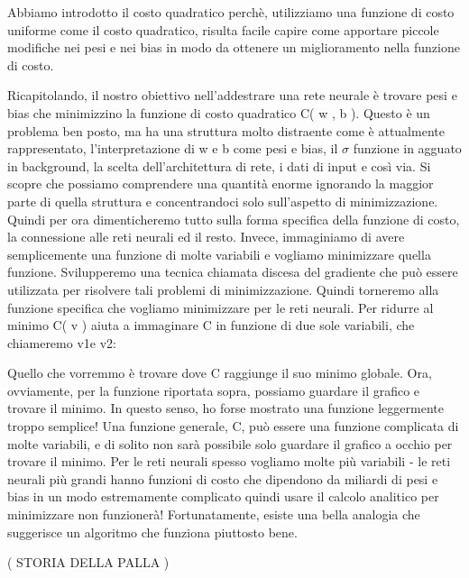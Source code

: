 Abbiamo introdotto il costo quadratico perchè, utilizziamo una funzione di costo uniforme come il costo quadratico, risulta facile capire come apportare piccole modifiche nei pesi e nei bias in modo da ottenere un miglioramento nella funzione di costo.

Ricapitolando, il nostro obiettivo nell'addestrare una rete neurale è trovare pesi e bias che minimizzino la funzione di costo quadratico C( w , b ). Questo è un problema ben posto, ma ha una struttura molto distraente come è attualmente rappresentato, l'interpretazione di w e b come pesi e bias, il $\sigma$ funzione in agguato in background, la scelta dell'architettura di rete, i dati di input e così via. Si scopre che possiamo comprendere una quantità enorme ignorando la maggior parte di quella struttura e concentrandoci solo sull'aspetto di minimizzazione. Quindi per ora dimenticheremo tutto sulla forma specifica della funzione di costo, la connessione alle reti neurali ed il resto. Invece, immaginiamo di avere semplicemente una funzione di molte variabili e vogliamo minimizzare quella funzione. Svilupperemo una tecnica chiamata discesa del gradiente che può essere utilizzata per risolvere tali problemi di minimizzazione. Quindi torneremo alla funzione specifica che vogliamo minimizzare per le reti neurali.
Per ridurre al minimo C( v ) aiuta a immaginare C in funzione di due sole variabili, che chiameremo v1e v2:

Quello che vorremmo è trovare dove C raggiunge il suo minimo globale. Ora, ovviamente, per la funzione riportata sopra, possiamo guardare il grafico e trovare il minimo. In questo senso, ho forse mostrato una funzione leggermente troppo semplice! Una funzione generale, C, può essere una funzione complicata di molte variabili, e di solito non sarà possibile solo guardare il grafico a occhio per trovare il minimo.
Per le reti neurali spesso vogliamo molte più variabili - le reti neurali più grandi hanno funzioni di costo che dipendono da miliardi di pesi e bias in un modo estremamente complicato quindi usare il calcolo analitico per minimizzare non funzionerà!
Fortunatamente, esiste una bella analogia che suggerisce un algoritmo che funziona piuttosto bene.  

( STORIA DELLA PALLA )


